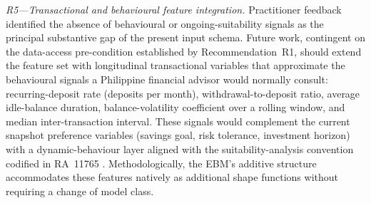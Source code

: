\documentclass{icsthesis}
\begin{document}
\begin{mainmatter}
					\textit{R5---Transactional and behavioural feature integration.} Practitioner feedback identified the absence of behavioural or ongoing-suitability signals as the principal substantive gap of the present input schema. Future work, contingent on the data-access pre-condition established by Recommendation~R1, should extend the feature set with longitudinal transactional variables that approximate the behavioural signals a Philippine financial advisor would normally consult: recurring-deposit rate (deposits per month), withdrawal-to-deposit ratio, average idle-balance duration, balance-volatility coefficient over a rolling window, and median inter-transaction interval. These signals would complement the current snapshot preference variables (savings goal, risk tolerance, investment horizon) with a dynamic-behaviour layer aligned with the suitability-analysis convention codified in RA~11765 \cite{ref44}. Methodologically, the EBM's additive structure accommodates these features natively as additional shape functions without requiring a change of model class.


\end{mainmatter}
\end{document}
